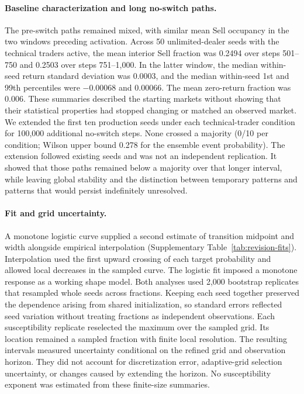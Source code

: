\paragraph{Baseline characterization and long no-switch paths.}
The pre-switch paths remained mixed, with similar mean Sell occupancy
in the two windows preceding activation. Across 50 unlimited-dealer
seeds with the technical traders active, the mean interior Sell fraction was
0.2494 over steps 501--750 and
0.2503 over steps 751--1,000. In the
latter window, the median within-seed return standard deviation was
$0.0003$, and the median within-seed
1st and 99th percentiles were $-0.00068$
and $0.00066$. The mean zero-return
fraction was 0.006. These summaries described the starting markets without showing that
their statistical properties had stopped changing or matched an
observed market. We extended the first ten production seeds
under each technical-trader condition for 100,000 additional no-switch steps. None
crossed a majority (0/10 per condition; Wilson upper bound 0.278
for the ensemble event probability). The extension followed existing
seeds and was not an independent replication. It showed that those
paths remained below a majority over that longer interval, while
leaving global stability and the distinction between temporary patterns and patterns that would persist indefinitely
unresolved.

\paragraph{Fit and grid uncertainty.}
A monotone logistic curve supplied a second estimate of transition
midpoint and width alongside empirical interpolation
(Supplementary Table~\ref{tab:revision-fits}). Interpolation used
the first upward crossing of each target probability and allowed
local decreases in the sampled curve. The logistic fit imposed a
monotone response as a working shape model. Both analyses used 2,000
bootstrap replicates that resampled whole seeds across fractions.
Keeping each seed together preserved the dependence arising from
shared initialization, so standard errors reflected seed variation
without treating fractions as independent observations. Each
susceptibility replicate reselected the maximum over the sampled grid.
Its location remained a sampled fraction with finite local resolution.
The resulting intervals measured uncertainty conditional on the refined
grid and observation horizon. They did not account for discretization
error, adaptive-grid selection uncertainty, or changes caused by
extending the horizon. No susceptibility exponent was estimated from
these finite-size summaries.
